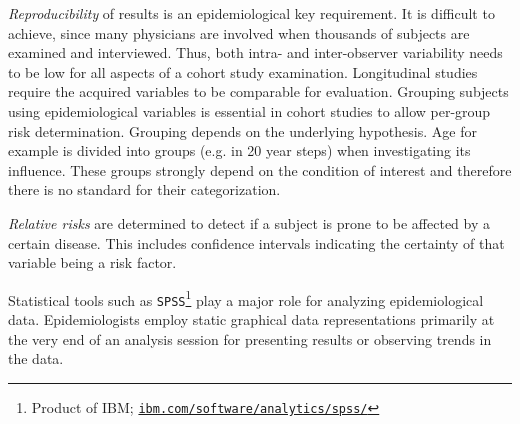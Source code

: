 \documentclass[journal]{style/vgtc} 			          %
\newcommand{\add}[1]{\textcolor{blue}{\uline{#1}}}
\begin{document}
\emph{Reproducibility} of results is an epidemiological key requirement.
%
It is difficult to achieve, since many physicians are involved when thousands of subjects are examined and interviewed.
%
Thus, both intra- and inter-observer variability needs to be low for all aspects of a cohort study examination.
%
Longitudinal studies require the acquired variables to be comparable for evaluation.
%
%
%
Grouping subjects using epidemiological variables is essential in cohort studies to allow per-group risk determination.
%
Grouping depends on the underlying hypothesis.
%
Age for example is divided into groups (e.g. in 20 year steps) when investigating its influence.
%
These groups strongly depend on the condition of interest and therefore there is no standard for their categorization.

%
\emph{Relative risks} are determined to detect if a subject is prone to be affected by a certain disease.
%
This includes confidence intervals indicating the certainty of that variable being a risk factor.
%
%
%
%
%
%

Statistical tools such as \texttt{SPSS}\footnote{Product of IBM; \href{http://ibm.com/software/analytics/spss/}{\texttt{ibm.com/software/analytics/spss/}}} play a major role for analyzing epidemiological data.
%
Epidemiologists employ static graphical data representations primarily at the very end of an analysis session for presenting results or observing trends in the data.
	
\end{document}
